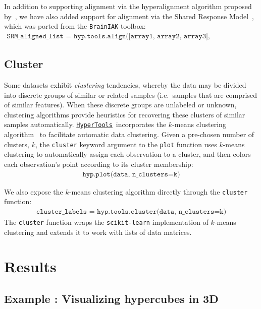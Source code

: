 \documentclass[12pt,letterpaper]{article}
\newcommand{\hypertools}{\href{https://github.com/ContextLab/hypertools}{\texttt{HyperTools}}}
\newcounter{example}
\begin{document}
In addition to supporting alignment via the hyperalignment algorithm proposed by~\cite{HaxbEtal11}, we have also added support for alignment via the Shared Response Model~\cite{ChenEtal15}, which was ported from the \texttt{BrainIAK} toolbox:
\begin{align}
\texttt{SRM\_aligned\_list = hyp.tools.align([array1, array2, array3], method='SRM')}
\end{align}





\subsection*{Cluster}
Some datasets exhibit \textit{clustering} tendencies, whereby the data may be divided into discrete groups of similar or related samples (i.e.\ samples that are comprised of similar features).  When these discrete groups are unlabeled or unknown, clustering algorithms provide heuristics for recovering these clusters of similar samples automatically.  \hypertools~incorporates the $k$-means clustering algorithm~\cite{HartWong79} to facilitate automatic data clustering.  Given a pre-chosen number of clusters, $k$, the \texttt{cluster} keyword argument to the \texttt{plot} function uses $k$-means clustering to automatically assign each observation to a cluster, and then colors each observation's point according to its cluster membership:
\begin{align}
\texttt{hyp.plot(data, n\_clusters=k)}
\end{align}

We also expose the $k$-means clustering algorithm directly through the \texttt{cluster} function:
\begin{align}
\texttt{cluster\_labels = hyp.tools.cluster(data, n\_clusters=k)}
\end{align}
The \texttt{cluster} function wraps the \texttt{scikit-learn} implementation of $k$-means clustering and extends it to work with lists of data matrices.





\section*{Results}
\subsection*{Example : Visualizing hypercubes in 3D}
\end{document}
